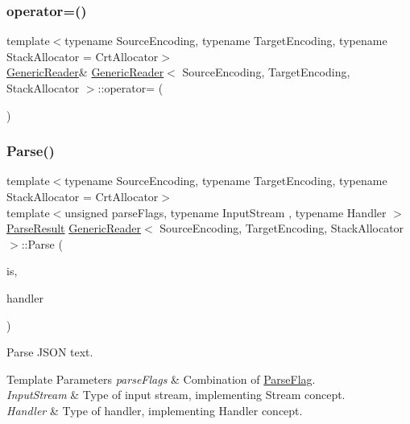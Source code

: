 \subsubsection{\texorpdfstring{operator=()}{operator=()}}
{\footnotesize\ttfamily template$<$typename Source\+Encoding, typename Target\+Encoding, typename Stack\+Allocator = Crt\+Allocator$>$ \\
\hyperlink{classGenericReader}{Generic\+Reader}\& \hyperlink{classGenericReader}{Generic\+Reader}$<$ Source\+Encoding, Target\+Encoding, Stack\+Allocator $>$\+::operator= (\begin{DoxyParamCaption}\item[{const \hyperlink{classGenericReader}{Generic\+Reader}$<$ Source\+Encoding, Target\+Encoding, Stack\+Allocator $>$ \&}]{ }\end{DoxyParamCaption})\hspace{0.3cm}{\ttfamily [private]}}

\mbox{\label{classGenericReader_a0c450620d14ff1824e58bb7bd9b42099}} 
\subsubsection{\texorpdfstring{Parse()}{Parse()}\hspace{0.1cm}{\footnotesize\ttfamily [1/2]}}
{\footnotesize\ttfamily template$<$typename Source\+Encoding, typename Target\+Encoding, typename Stack\+Allocator = Crt\+Allocator$>$ \\
template$<$unsigned parse\+Flags, typename Input\+Stream , typename Handler $>$ \\
\hyperlink{structParseResult}{Parse\+Result} \hyperlink{classGenericReader}{Generic\+Reader}$<$ Source\+Encoding, Target\+Encoding, Stack\+Allocator $>$\+::Parse (\begin{DoxyParamCaption}\item[{Input\+Stream \&}]{is,  }\item[{Handler \&}]{handler }\end{DoxyParamCaption})\hspace{0.3cm}{\ttfamily [inline]}}



Parse J\+S\+ON text. 


\begin{DoxyTemplParams}{Template Parameters}
{\em parse\+Flags} & Combination of \hyperlink{reader_8h_ab7be7dabe6ffcba60fad441505583450}{Parse\+Flag}. \\
\hline
{\em Input\+Stream} & Type of input stream, implementing Stream concept. \\
\hline
{\em Handler} & Type of handler, implementing Handler concept. \\
\hline
\end{DoxyTemplParams}

